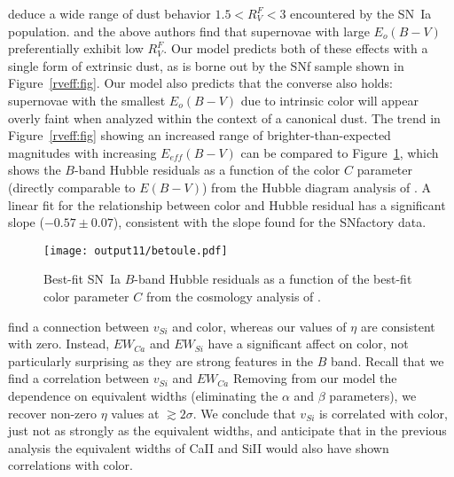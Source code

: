 \documentclass{aastex}   	%
\begin{document}
\citet{2014ApJ...789...32B, 2015MNRAS.453.3300A} deduce a wide range of dust behavior $1.5<R^F_V<3$ encountered by the SN~Ia population.
\citet{2011ApJ...729...55F} and the above authors
find that supernovae with large $E_o(B-V)$ 
preferentially exhibit low $R^F_V$. 
Our model predicts both of these effects with a single form of extrinsic dust, as is borne out by the
SNf sample shown in Figure~\ref{rveff:fig}. 
Our model also predicts that the converse also holds: supernovae with the smallest $E_o(B-V)$ due to intrinsic color
will appear overly faint when analyzed within the context of a canonical dust.
The trend in Figure~\ref{rveff:fig} showing an increased range of brighter-than-expected magnitudes  with increasing $E_{eff}(B-V)$  can
be compared
to Figure~\ref{betoule:fig}, which shows the $B$-band  Hubble residuals as a function of the color $C$ parameter (directly
comparable to $E(B-V)$) from the Hubble diagram analysis of \citet{2014A&A...568A..22B}.
A linear fit for the relationship between color and Hubble residual has a significant slope ($-0.57 \pm 0.07$), consistent with the slope
found for the SNfactory data.

\begin{figure}[htbp] %
   \centering
   \texttt{[image: output11/betoule.pdf]} 
   \caption{Best-fit SN~Ia  $B$-band Hubble residuals as a function of the best-fit color parameter $C$ from the cosmology analysis of \citet{2014A&A...568A..22B}.
   \label{betoule:fig}}
\end{figure}


\citet{2009ApJ...699L.139W, 2011ApJ...729...55F} find a connection between $v_{Si}$ and color, whereas
our values of $\eta$ are consistent with zero. Instead,  $EW_{Ca}$ and $EW_{Si}$ have a significant affect on color, not particularly 
surprising as they
are strong features in the $B$ band.
Recall that we find a correlation between $v_{Si}$ and $EW_{Ca}$
Removing from our model the dependence on equivalent widths (eliminating the  $\alpha$ and $\beta$ parameters), we recover
non-zero $\eta$ values at  $\gtrsim 2\sigma$.  We conclude that $v_{Si}$ is correlated with color, just not as strongly as the equivalent widths,
and  anticipate that in the previous analysis the equivalent widths of CaII and 
SiII would also have shown correlations with color.
\end{document}
